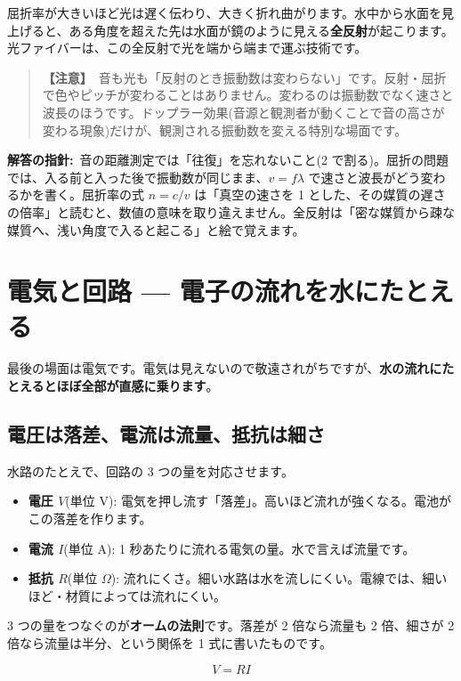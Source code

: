 \documentclass{article}
\begin{document}
屈折率が大きいほど光は遅く伝わり、大きく折れ曲がります。水中から水面を見上げると、ある角度を超えた先は水面が鏡のように見える\textbf{全反射}が起こります。光ファイバーは、この全反射で光を端から端まで運ぶ技術です。

\begin{quote}
\textbf{【注意】}\ 音も光も「反射のとき振動数は変わらない」です。反射・屈折で色やピッチが変わることはありません。変わるのは振動数でなく速さと波長のほうです。ドップラー効果(音源と観測者が動くことで音の高さが変わる現象)だけが、観測される振動数を変える特別な場面です。
\end{quote}

\textbf{解答の指針:}\ 音の距離測定では「往復」を忘れないこと(2 で割る)。屈折の問題では、入る前と入った後で振動数が同じまま、\( v = f\lambda \) で速さと波長がどう変わるかを書く。屈折率の式 \( n = c/v \) は「真空の速さを 1 とした、その媒質の遅さの倍率」と読むと、数値の意味を取り違えません。全反射は「密な媒質から疎な媒質へ、浅い角度で入ると起こる」と絵で覚えます。

\section{電気と回路 — 電子の流れを水にたとえる}

最後の場面は電気です。電気は見えないので敬遠されがちですが、\textbf{水の流れにたとえるとほぼ全部が直感に乗ります}。

\subsection{電圧は落差、電流は流量、抵抗は細さ}

水路のたとえで、回路の 3 つの量を対応させます。

\begin{itemize}
\item \textbf{電圧 \( V \)}(単位 V): 電気を押し流す「落差」。高いほど流れが強くなる。電池がこの落差を作ります。
\item \textbf{電流 \( I \)}(単位 A): 1 秒あたりに流れる電気の量。水で言えば流量です。
\item \textbf{抵抗 \( R \)}(単位 \( \Omega \)): 流れにくさ。細い水路は水を流しにくい。電線では、細いほど・材質によっては流れにくい。
\end{itemize}

3 つの量をつなぐのが\textbf{オームの法則}です。落差が 2 倍なら流量も 2 倍、細さが 2 倍なら流量は半分、という関係を 1 式に書いたものです。

\[ V = RI \]
\end{document}
